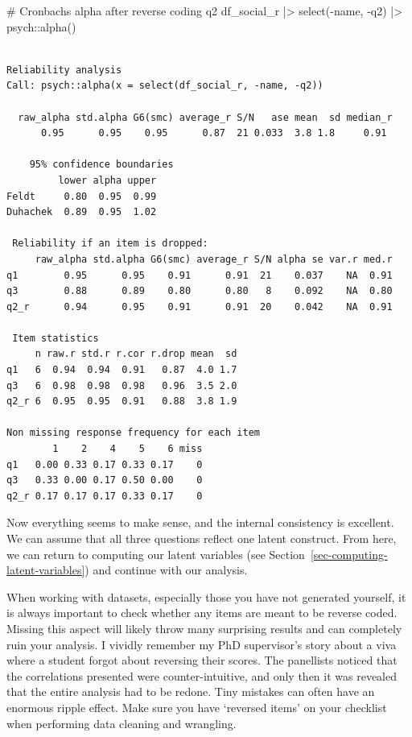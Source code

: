 \documentclass[
  letterpaper,
]{krantz}
\makeatletter
\newenvironment{Shaded}{\begin{snugshade}}{\end{snugshade}}
\newcommand{\CommentTok}[1]{\textcolor[rgb]{0.37,0.37,0.37}{#1}}
\newcommand{\FunctionTok}[1]{\textcolor[rgb]{0.28,0.35,0.67}{#1}}
\newcommand{\NormalTok}[1]{\textcolor[rgb]{0.00,0.23,0.31}{#1}}
\newcommand{\SpecialCharTok}[1]{\textcolor[rgb]{0.37,0.37,0.37}{#1}}
\newenvironment{kframe}{%
\medskip{}
\setlength{\fboxsep}{.8em}
 \def\at@end@of@kframe{}%
 \ifinner\ifhmode%
  \def\at@end@of@kframe{\end{minipage}}%
  \begin{minipage}{\columnwidth}%
 \fi\fi%
 \def\FrameCommand##1{\hskip\@totalleftmargin \hskip-\fboxsep
 \colorbox{shadecolor}{##1}\hskip-\fboxsep
     \hskip-\linewidth \hskip-\@totalleftmargin \hskip\columnwidth}%
 \MakeFramed {\advance\hsize-\width
   \@totalleftmargin\z@ \linewidth\hsize
   \@setminipage}}%
 {\par\unskip\endMakeFramed%
 \at@end@of@kframe}
\renewenvironment{Shaded}{\begin{kframe}}{\end{kframe}}
\makeatother
\begin{document}
\begin{Shaded}
\begin{Highlighting}[]
\CommentTok{\# Cronbach\textquotesingle{}s alpha after reverse coding q2}
\NormalTok{df\_social\_r }\SpecialCharTok{|\textgreater{}}
  \FunctionTok{select}\NormalTok{(}\SpecialCharTok{{-}}\NormalTok{name, }\SpecialCharTok{{-}}\NormalTok{q2) }\SpecialCharTok{|\textgreater{}}
\NormalTok{  psych}\SpecialCharTok{::}\FunctionTok{alpha}\NormalTok{()}
\end{Highlighting}
\end{Shaded}

\begin{verbatim}

Reliability analysis   
Call: psych::alpha(x = select(df_social_r, -name, -q2))

  raw_alpha std.alpha G6(smc) average_r S/N   ase mean  sd median_r
      0.95      0.95    0.95      0.87  21 0.033  3.8 1.8     0.91

    95% confidence boundaries 
         lower alpha upper
Feldt     0.80  0.95  0.99
Duhachek  0.89  0.95  1.02

 Reliability if an item is dropped:
     raw_alpha std.alpha G6(smc) average_r S/N alpha se var.r med.r
q1        0.95      0.95    0.91      0.91  21    0.037    NA  0.91
q3        0.88      0.89    0.80      0.80   8    0.092    NA  0.80
q2_r      0.94      0.95    0.91      0.91  20    0.042    NA  0.91

 Item statistics 
     n raw.r std.r r.cor r.drop mean  sd
q1   6  0.94  0.94  0.91   0.87  4.0 1.7
q3   6  0.98  0.98  0.98   0.96  3.5 2.0
q2_r 6  0.95  0.95  0.91   0.88  3.8 1.9

Non missing response frequency for each item
        1    2    4    5    6 miss
q1   0.00 0.33 0.17 0.33 0.17    0
q3   0.33 0.00 0.17 0.50 0.00    0
q2_r 0.17 0.17 0.17 0.33 0.17    0
\end{verbatim}

Now everything seems to make sense, and the internal consistency is
excellent. We can assume that all three questions reflect one latent
construct. From here, we can return to computing our latent variables
(see Section~\ref{sec-computing-latent-variables}) and continue with our
analysis.

When working with datasets, especially those you have not generated
yourself, it is always important to check whether any items are meant to
be reverse coded. Missing this aspect will likely throw many surprising
results and can completely ruin your analysis. I vividly remember my PhD
supervisor's story about a viva where a student forgot about reversing
their scores. The panellists noticed that the correlations presented
were counter-intuitive, and only then it was revealed that the entire
analysis had to be redone. Tiny mistakes can often have an enormous
ripple effect. Make sure you have `reversed items' on your checklist
when performing data cleaning and wrangling.
\end{document}
